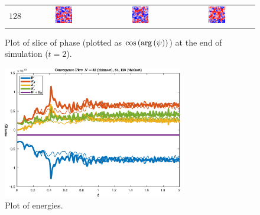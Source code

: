 \documentclass{article}
\begin{document}
\begin{figure}[ht]
\begin{tabular}{cccc}
$128$ & 
\includegraphics[width=0.24\textwidth]{s42r128s20psi1_phase.png} &
\includegraphics[width=0.24\textwidth]{s42r128s20psi2_phase.png} &
\includegraphics[width=0.24\textwidth]{s42r128s20psi3_phase.png} \\
\end{tabular}
\caption{Plot of slice of phase (plotted as $\cos\left({\rm arg}\left(\psi\right)\right)$) at the end of simulation ($t=2$).}
\end{figure}


\begin{figure}[ht]
\includegraphics[width=0.7\textwidth]{energies2.eps} 
\caption{Plot of energies.}
\end{figure}
\end{document}
